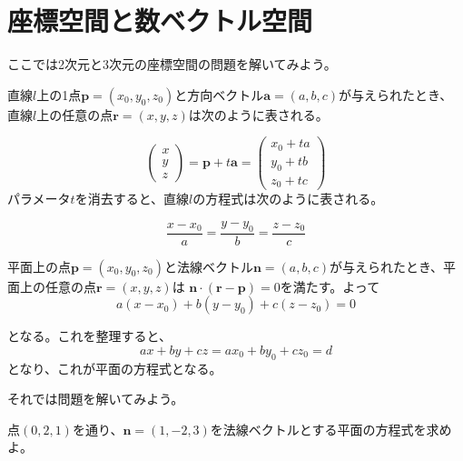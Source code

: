 \documentclass{jlreq}
\begin{document}
\section{座標空間と数ベクトル空間}
ここでは2次元と3次元の座標空間の問題を解いてみよう。

\begin{theorembox}[直線のパラメータ表示]
  直線$l$上の1点$\boldsymbol{p} = (x_0, y_0, z_0)$と方向ベクトル$\boldsymbol{a} = (a, b, c)$が与えられたとき、直線$l$上の任意の点$\boldsymbol{r} = (x, y, z)$は次のように表される。

  \begin{equation*}
    \begin{pmatrix}
      x \\ y \\ z 
    \end{pmatrix}
    = \boldsymbol{p} + t \boldsymbol{a} = 
    \begin{pmatrix}
      x_0 + t a \\ y_0 + t b \\ z_0 + t c
    \end{pmatrix}
  \end{equation*}
  パラメータ$t$を消去すると、直線$l$の方程式は次のように表される。

  \begin{equation*}
    \frac{x - x_0}{a} = \frac{y - y_0}{b} = \frac{z - z_0}{c}
  \end{equation*}
\end{theorembox}

\begin{theorembox}[平面の方程式]
  平面上の点$\boldsymbol{p} = (x_0, y_0, z_0)$と法線ベクトル$\boldsymbol{n} = (a, b, c)$が与えられたとき、平面上の任意の点$\boldsymbol{r} = (x, y, z)$は
  $\boldsymbol{n} \cdot (\boldsymbol{r} - \boldsymbol{p}) = 0$を満たす。よって
  \begin{equation*}
    a(x - x_0) + b(y - y_0) + c(z - z_0) = 0
  \end{equation*}

  となる。これを整理すると、
  \begin{equation*}
    ax + by + cz = a x_0 + b y_0 + c z_0 = d
  \end{equation*}
   となり、これが平面の方程式となる。
\end{theorembox}

それでは問題を解いてみよう。

\begin{problem}
  点$(0, 2, 1)$を通り、$\boldsymbol{n} = (1, -2, 3)$を法線ベクトルとする平面の方程式を求めよ。
\end{problem}
\end{document}
